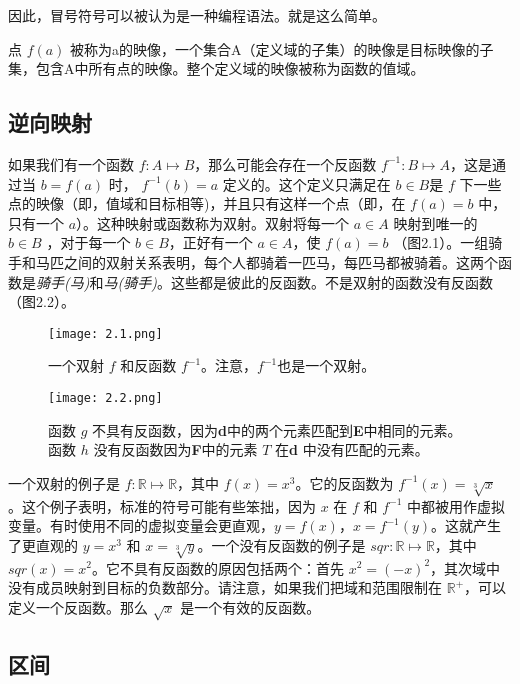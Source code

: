 \documentclass[lang=cn,12pt]{elegantbook}
\begin{document}
因此，冒号符号可以被认为是一种编程语法。就是这么简单。

点 $f(a)$ 被称为a的映像，一个集合A（定义域的子集）的映像是目标映像的子集，包含A中所有点的映像。整个定义域的映像被称为函数的值域。

\subsection{逆向映射}

如果我们有一个函数 $f : A \mapsto B$，那么可能会存在一个反函数 $f^{-1} : B \mapsto A$，这是通过当 $b = f(a)$ 时， $f^{-1}(b) = a$ 定义的。这个定义只满足在 $b \in B$是 $f$ 下一些点的映像（即，值域和目标相等)，并且只有这样一个点（即，在 $f(a) = b$ 中，只有一个 $a$）。这种映射或函数称为双射。双射将每一个 $a \in A$ 映射到唯一的 $b \in B$ ，对于每一个 $b \in B$，正好有一个 $a \in A$，使 $f(a)=b$ （图2.1）。一组骑手和马匹之间的双射关系表明，每个人都骑着一匹马，每匹马都被骑着。这两个函数是\textit{骑手(马)}和\textit{马(骑手)}。这些都是彼此的反函数。不是双射的函数没有反函数（图2.2）。

\begin{figure}[htb]
\centering
\begin{minipage}[t]{0.45\textwidth}
\centering
\texttt{[image: 2.1.png]}
\caption{一个双射 $f$ 和反函数 $f^{-1}$。注意，$f^{-1}$也是一个双射。}
\end{minipage}
\begin{minipage}[t]{0.45\textwidth}
\centering
\texttt{[image: 2.2.png]}
\caption{函数 $g$ 不具有反函数，因为\textbf{d}中的两个元素匹配到\textbf{E}中相同的元素。函数 $h$ 没有反函数因为\textbf{F}中的元素 $T$ 在\textbf{d} 中没有匹配的元素。}
\end{minipage}
\end{figure}

一个双射的例子是 $f : \mathbb{R} \mapsto \mathbb{R}$，其中 $f(x) = x^3$。它的反函数为 $f^{-1}(x) = \sqrt[3]{x}$ 。这个例子表明，标准的符号可能有些笨拙，因为 $x$ 在 $f$ 和 $f^{-1}$ 中都被用作虚拟变量。有时使用不同的虚拟变量会更直观，$y = f(x)$，$x=f^{-1}(y)$。这就产生了更直观的 $y = x^3$ 和 $x = \sqrt[3]{y}$。一个没有反函数的例子是 $sqr : \mathbb{R} \mapsto \mathbb{R}$，其中 $sqr(x) = x^2$。它不具有反函数的原因包括两个：首先 $x^2 = (-x)^2$，其次域中没有成员映射到目标的负数部分。请注意，如果我们把域和范围限制在 $\mathbb{R^+}$，可以定义一个反函数。那么 $\sqrt{x}$ 是一个有效的反函数。

\subsection{区间}
\end{document}
